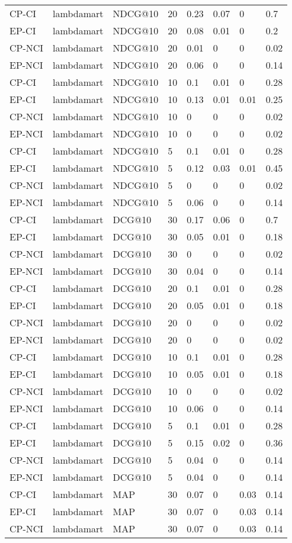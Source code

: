 \begin{landscape}
\begin{longtable}{|*{8}{l|}}
\hline
CP-CI&lambdamart&NDCG@10&20&0.23&0.07&0&0.7\\
EP-CI&lambdamart&NDCG@10&20&0.08&0.01&0&0.2\\
CP-NCI&lambdamart&NDCG@10&20&0.01&0&0&0.02\\
EP-NCI&lambdamart&NDCG@10&20&0.06&0&0&0.14\\
\hline
CP-CI&lambdamart&NDCG@10&10&0.1&0.01&0&0.28\\
EP-CI&lambdamart&NDCG@10&10&0.13&0.01&0.01&0.25\\
CP-NCI&lambdamart&NDCG@10&10&0&0&0&0.02\\
EP-NCI&lambdamart&NDCG@10&10&0&0&0&0.02\\
\hline
CP-CI&lambdamart&NDCG@10&5&0.1&0.01&0&0.28\\
EP-CI&lambdamart&NDCG@10&5&0.12&0.03&0.01&0.45\\
CP-NCI&lambdamart&NDCG@10&5&0&0&0&0.02\\
EP-NCI&lambdamart&NDCG@10&5&0.06&0&0&0.14\\
\hline
CP-CI&lambdamart&DCG@10&30&0.17&0.06&0&0.7\\
EP-CI&lambdamart&DCG@10&30&0.05&0.01&0&0.18\\
CP-NCI&lambdamart&DCG@10&30&0&0&0&0.02\\
EP-NCI&lambdamart&DCG@10&30&0.04&0&0&0.14\\
\hline
CP-CI&lambdamart&DCG@10&20&0.1&0.01&0&0.28\\
EP-CI&lambdamart&DCG@10&20&0.05&0.01&0&0.18\\
CP-NCI&lambdamart&DCG@10&20&0&0&0&0.02\\
EP-NCI&lambdamart&DCG@10&20&0&0&0&0.02\\
\hline
CP-CI&lambdamart&DCG@10&10&0.1&0.01&0&0.28\\
EP-CI&lambdamart&DCG@10&10&0.05&0.01&0&0.18\\
CP-NCI&lambdamart&DCG@10&10&0&0&0&0.02\\
EP-NCI&lambdamart&DCG@10&10&0.06&0&0&0.14\\
\hline
CP-CI&lambdamart&DCG@10&5&0.1&0.01&0&0.28\\
EP-CI&lambdamart&DCG@10&5&0.15&0.02&0&0.36\\
CP-NCI&lambdamart&DCG@10&5&0.04&0&0&0.14\\
EP-NCI&lambdamart&DCG@10&5&0.04&0&0&0.14\\
\hline
CP-CI&lambdamart&MAP&30&0.07&0&0.03&0.14\\
EP-CI&lambdamart&MAP&30&0.07&0&0.03&0.14\\
CP-NCI&lambdamart&MAP&30&0.07&0&0.03&0.14\\

\end{longtable}
\end{landscape}
